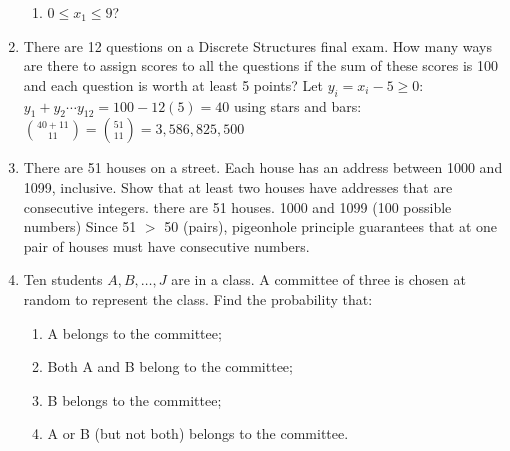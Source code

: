 \documentclass{article}
\begin{document}
\begin{enumerate}
\begin{enumerate}
			
			\item $0 \leq x_1 \leq 9$?
			\subitem 
		
		\end{enumerate}
		
		\item There are 12 questions on a Discrete Structures final exam. How many ways are there to assign scores to all the questions if the sum of these scores is 100 and each question is worth at least 5 points?
		\subitem Let $y_i = x_i - 5 \geq 0$:
		\subitem $y_1 + y_2 \cdots y_12 = 100 - 12(5) = 40$
		\subitem using stars and bars:
		\subitem $\binom{40+11}{11} = \binom{51}{11} = 3,586,825,500$
		
		\item There are 51 houses on a street. Each house has an address between 1000 and 1099, inclusive. Show that at least two houses have addresses that are consecutive integers.
		\subitem there are 51 houses. 1000 and 1099 (100 possible numbers)
		\subitem Since 51 $>$ 50 (pairs), pigeonhole principle guarantees that at one pair of houses must have consecutive numbers.
		
		\item Ten students $A,B, \dots, J$ are in a class. A committee of three is chosen at random to represent the class. Find the probability that:
		\begin{enumerate}
			\item A belongs to the committee;
			\item Both A and B belong to the committee;
			\item B belongs to the committee;
			\item A or B (but not both) belongs to the committee.
		\end{enumerate}
		
		
	\end{enumerate}
	
\end{document}
